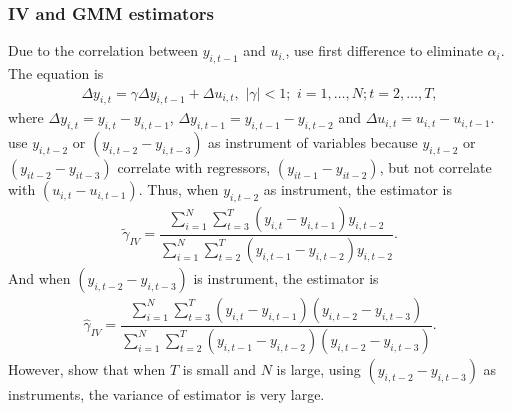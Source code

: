 \documentclass[12pt,a4paper,hyperref]{article}
\begin{document}
\subsubsection{IV and GMM estimators}
Due to the correlation between $y_{i,t-1}$ and $u_{i.}$, \citet{Anderson:1982} use first difference to eliminate $\alpha_{i}$. The equation is
\begin{align}
\Delta y_{i,t}=\gamma \Delta y_{i,t-1}+\Delta u_{i,t},\,\,\left\vert\gamma \right\vert<1; \,\, i=1,\ldots, N; t=2, \ldots, T, \label{five}
\end{align}
where $\Delta y_{i,t}=y_{i,t}-y_{i,t-1}$, $\Delta y_{i,t-1}=y_{i,t-1}-y_{i,t-2}$ and $\Delta u_{i,t}=u_{i,t}-u_{i,t-1}$.
\citet{Anderson:1982} use $y_{i,t-2}$ or $\left(y_{i,t-2}-y_{i,t-3} \right)$ as instrument of variables because $y_{i,t-2}$ or $\left( y_{it-2}-y_{it-3} \right)$ correlate with regressors, $\left( y_{it-1}-y_{it-2}  \right)$, but not correlate with $\left(u_{i,t}-u_{i,t-1}   \right)$. Thus, when $y_{i,t-2}$ as instrument, the estimator is
\begin{align}
\tilde{\gamma}_{IV}=\dfrac{\sum^{N}_{i=1}\sum^{T}_{t=3}\left(y_{i,t}-y_{i,t-1} \right) y_{i,t-2} }{\sum^{N}_{i=1}\sum^{T}_{t=2}\left( y_{i,t-1}-y_{i,t-2}   \right)y_{i,t-2}}.
\end{align}
And when  $\left( y_{i,t-2}-y_{i,t-3} \right)$ is instrument, the estimator is
\begin{align}
\hat{\gamma}_{IV}=\dfrac{\sum^{N}_{i=1}\sum^{T}_{t=3}\left(y_{i,t}-y_{i,t-1} \right) \left( y_{i,t-2}-y_{i,t-3}\right) }{\sum^{N}_{i=1}\sum^{T}_{t=2}\left( y_{i,t-1}-y_{i,t-2} \right)\left( y_{i,t-2}-y_{i,t-3}\right)}.
\end{align}
However, \citet{Arellano:1989} show that when $T$ is small and $N$ is large, using $\left(y_{i,t-2}-y_{i,t-3} \right)$ as instruments, the variance of estimator is very large.
\end{document}
